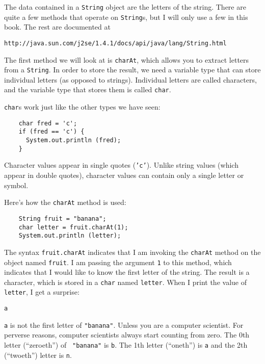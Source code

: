 \documentclass{book}
\begin{document}

The data contained in a {\tt String} object are the letters of the string.
There are quite a few methods that operate on {\tt String}s, but
I will only use a few in this book.  The rest are documented at

\begin{verbatim}
http://java.sun.com/j2se/1.4.1/docs/api/java/lang/String.html
\end{verbatim}
%
The first method we will look at is {\tt charAt}, which allows you
to extract letters from a {\tt String}.  In order to store the result, we
need a variable type that can store individual letters (as opposed
to strings).  Individual letters are called characters, and the
variable type that stores them is called {\tt char}.


{\tt char}s work just like the other types we have seen:

\begin{verbatim}
    char fred = 'c';
    if (fred == 'c') {
      System.out.println (fred);
    }
\end{verbatim}
%
Character values appear in single quotes ({\tt 'c'}).  Unlike
string values (which appear in double quotes), character values
can contain only a single letter or symbol.


Here's how the {\tt charAt} method is used:

\begin{verbatim}
    String fruit = "banana";
    char letter = fruit.charAt(1);
    System.out.println (letter);
\end{verbatim}
%
The syntax {\tt fruit.charAt} indicates that I am 
invoking the {\tt charAt} method on the object named
{\tt fruit}.
I am passing the argument {\tt 1} to this method,
which indicates that I would like to know the first letter of
the string.  The result is a character, which is stored in a
{\tt char} named {\tt letter}.  When I print the value of
{\tt letter}, I get a surprise:

\begin{verbatim}
a
\end{verbatim}
%
{\tt a} is not the first letter of {\tt "banana"}.  Unless you are a
computer scientist.  For perverse reasons, computer scientists always
start counting from zero.  The 0th letter (``zeroeth'') of {\tt
"banana"} is {\tt b}.  The 1th letter (``oneth'') is {\tt a} and the
2th (``twoeth'') letter is {\tt n}.
\end{document}
